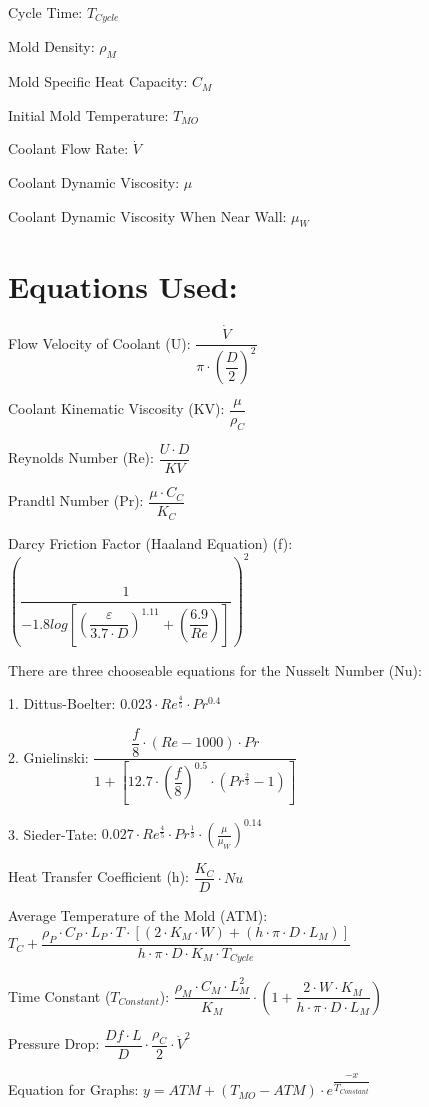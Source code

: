 \documentclass[a4paper,12pt]{article}
\begin{document}
Cycle Time: $T_{Cycle}$

Mold Density: $\rho_{M}$

Mold Specific Heat Capacity: $C_{M}$

Initial Mold Temperature: $T_{MO}$

Coolant Flow Rate: $\dot{V}$

Coolant Dynamic Viscosity: $\mu$

Coolant Dynamic Viscosity When Near Wall: $\mu_{W}$

\clearpage

\section*{Equations Used:}

\medskip

Flow Velocity of Coolant (U): $\dfrac{\dot{V}}{\pi \cdot (\dfrac{D}{2})^{2}}$

\medskip

Coolant Kinematic Viscosity (KV): $\dfrac{\mu}{\rho_{C}}$

\medskip

Reynolds Number (Re): $\dfrac{U \cdot D}{KV}$

\medskip

Prandtl Number (Pr): $\dfrac{\mu \cdot C_{C}}{K_{C}}$

\medskip

Darcy Friction Factor (Haaland Equation) (f): $(\dfrac{1}{-1.8log[(\dfrac{\varepsilon}{3.7 \cdot D})^{1.11}+(\dfrac{6.9}{Re})]})^{2}$

\medskip

There are three chooseable equations for the Nusselt Number (Nu):

1. Dittus-Boelter: $0.023 \cdot Re^{\frac{4}{5}} \cdot Pr^{0.4}$

\medskip

2. Gnielinski: $\dfrac{\dfrac{f}{8} \cdot (Re-1000) \cdot Pr}{1 + [12.7 \cdot (\dfrac{f}{8})^{0.5} \cdot (Pr^{\frac{2}{3}}-1)]}$

\medskip

3. Sieder-Tate: $0.027 \cdot Re^{\frac{4}{5}} \cdot Pr^{\frac{1}{3}} \cdot (\frac{\mu}{\mu_{W}})^{0.14}$

\medskip

Heat Transfer Coefficient (h): $\dfrac{K_{C}}{D} \cdot Nu$

\medskip

Average Temperature of the Mold (ATM): $T_{C} + \dfrac{\rho_{P} \cdot C_{P} \cdot L_{P} \cdot T \cdot [(2 \cdot K_{M} \cdot W) + (h \cdot \pi \cdot D \cdot L_{M})]}{h \cdot \pi \cdot D \cdot K_{M} \cdot T_{Cycle}}$ 

\medskip

Time Constant ($T_{Constant}$): $\dfrac{\rho_{M} \cdot C_{M} \cdot L_{M}^{2}}{K_{M}} \cdot (1 + \dfrac{2 \cdot W \cdot K_{M}}{h \cdot \pi \cdot D \cdot L_{M}})$

\medskip

Pressure Drop: $\dfrac{Df \cdot L}{D} \cdot \dfrac{\rho_{C}}{2} \cdot \dot{V}^{2}$

\medskip

Equation for Graphs: $y = ATM + (T_{MO} - ATM) \cdot e^{\dfrac{-x}{T_{Constant}}}$
\end{document}
